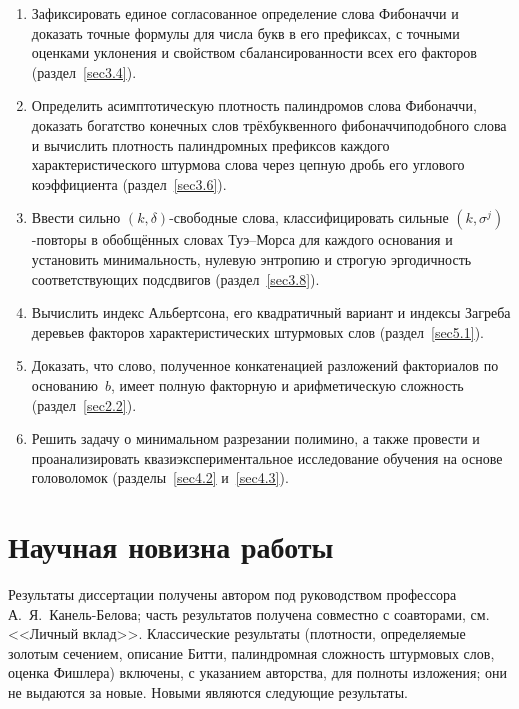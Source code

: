 \documentclass[a4paper,14pt]{extreport}
\theoremstyle{plain}
\theoremstyle{definition}
\theoremstyle{remark}
\begin{document}
	\begin{enumerate}
		\item Зафиксировать единое согласованное определение слова Фибоначчи и доказать точные формулы для числа букв в его префиксах, с точными оценками уклонения и свойством сбалансированности всех его факторов (раздел~\ref{sec3.4}).
		
		\item Определить асимптотическую плотность палиндромов слова Фибоначчи, доказать богатство конечных слов трёхбуквенного фибоначчиподобного слова и вычислить плотность палиндромных префиксов каждого характеристического штурмова слова через цепную дробь его углового коэффициента (раздел~\ref{sec3.6}).
		
		\item Ввести сильно $(k,\delta)$-свободные слова, классифицировать сильные $(k,\sigma^j)$-повторы в обобщённых словах Туэ--Морса для каждого основания и установить минимальность, нулевую энтропию и строгую эргодичность соответствующих подсдвигов (раздел~\ref{sec3.8}).
		
		\item Вычислить индекс Альбертсона, его квадратичный вариант и индексы Загреба деревьев факторов характеристических штурмовых слов (раздел~\ref{sec5.1}).
		
		\item Доказать, что слово, полученное конкатенацией разложений факториалов по основанию~$b$, имеет полную факторную и арифметическую сложность (раздел~\ref{sec2.2}).
		
		\item Решить задачу о минимальном разрезании полимино, а также провести и проанализировать квазиэкспериментальное исследование обучения на основе головоломок (разделы~\ref{sec4.2} и~\ref{sec4.3}).
	\end{enumerate}
	\section*{Научная новизна работы}
	
	Результаты диссертации получены автором под руководством профессора А.~Я.~Канель-Белова; часть результатов получена совместно с соавторами, см. <<Личный вклад>>.
	Классические результаты (плотности, определяемые золотым сечением, описание Битти, палиндромная сложность штурмовых слов, оценка Фишлера) включены, с указанием авторства, для полноты изложения; они не выдаются за новые.
	Новыми являются следующие результаты.
	
\end{document}
